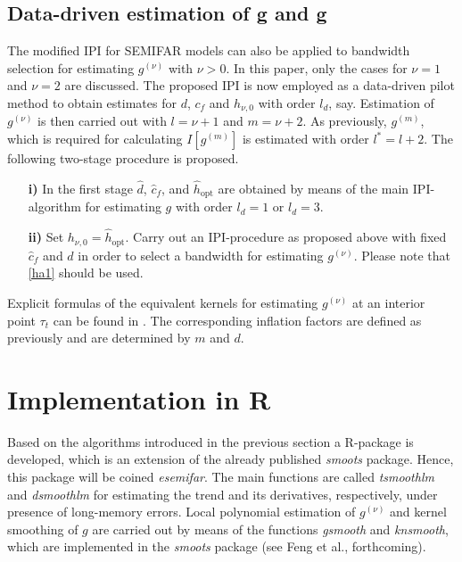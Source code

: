 \documentclass[12pt]{article}
\begin{document}

\subsection{Data-driven estimation of g\textquotesingle{} and g\textquotesingle \textquotesingle}
The modified IPI for SEMIFAR models can also be applied to bandwidth selection for estimating $g^{(\nu)}$ with $\nu > 0$. In this paper, only the cases for $\nu = 1$ and $\nu = 2$ are discussed. The proposed IPI is now employed as a data-driven pilot method to obtain estimates for $d$, $c_f$ and $h_{\nu, 0}$ with order $l_d$, say. Estimation of $g^{(\nu)}$ is then carried out with $l = \nu + 1$ and $m = \nu + 2$. As previously, $g^{(m)}$, which is required for calculating $I[g^{(m)}]$ is estimated with order $l^* = l + 2$. The following two-stage procedure is proposed.
\begin{itemize}
	\item[\textbf{i)}] In the first stage $\hat{d}$, $\hat{c}_f$, and $\hat{h}_{\text{opt}}$ are obtained by means of the main IPI-algorithm for estimating $g$ with order $l_d = 1$ or $l_d = 3$.
	
	\item[\textbf{ii)}] Set $h_{\nu,0} = \hat{h}_{\text{opt}}$. Carry out an IPI-procedure as proposed above with fixed $\hat{c}_f$ and $\hat{d}$ in order to select a bandwidth for estimating $g^{(\nu)}$. Please note that \eqref{ha1} should be used. 
\end{itemize}
Explicit formulas of the equivalent kernels for estimating $g^{(\nu)}$ at an interior point $\tau_t$ can be found in \citet{muller1988longitudinal}. The corresponding inflation factors are defined as previously and are determined by $m$ and $d$.

\section{Implementation in R}
Based on the algorithms introduced in the previous section a R-package is developed, which is an extension of the already published \textit{smoots} package. Hence, this package will be coined \textit{esemifar}. The main functions are called \textit{tsmoothlm} and \textit{dsmoothlm} for estimating the trend and its derivatives, respectively, under presence of long-memory errors. Local polynomial estimation of  $g^{(\nu)}$ and kernel smoothing of $g$ are carried out by means of the functions \textit{gsmooth} and \textit{knsmooth}, which are implemented in the \textit{smoots} package (see Feng et al., forthcoming).
\end{document}

